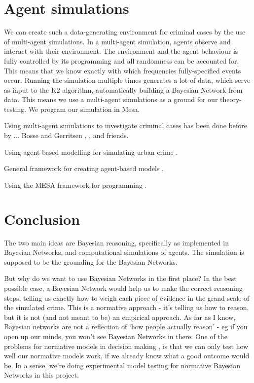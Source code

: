 \section{Agent simulations}
We can create such a data-generating environment for criminal cases by the use of multi-agent simulations. In a multi-agent simulation, agents observe and interact with their environment. The environment and the agent behaviour is fully controlled by its programming and all randomness can be accounted for. This means that we know exactly with which frequencies fully-specified events occur. Running the simulation multiple times generates a lot of data, which serve as input to the K2 algorithm, automatically building a Bayesian Network from data. This means we use a multi-agent simulations as a ground for our theory-testing. We program our simulation in Mesa.

Using multi-agent simulations to investigate criminal cases has been done before by ...
Bosse and Gerritsen \citep{Gerritsen2008}, \citep{Gerritsen2010}, \citep{Gerritsen2015} and friends.

Using agent-based modelling for simulating urban crime \citep{Zhu2021}.

General framework for creating agent-based models \citep{Lotzmann2019}.

Using the MESA framework for programming \citep{mesa2020}.





 \section{Conclusion}

The two main ideas are Bayesian reasoning, specifically as implemented in Bayesian Networks, and computational simulations of agents. The simulation is supposed to be the grounding for the Bayesian Networks.

But why do we want to use Bayesian Networks in the first place? In the best possible case, a Bayesian Network would help us to make the correct reasoning steps, telling us exactly how to weigh each piece of evidence in the grand scale of the simulated crime. This is a normative approach - it's telling us how to reason, but it is not (and not meant to be) an empirical approach. As far as I know, Bayesian networks are not a reflection of `how people actually reason' - eg if you open up our minds, you won't see Bayesian Networks in there. One of the problems for normative models in decision making \citep{colyvan2013}, is that we can only test how well our normative models work, if we already know what a good outcome would be. In a sense, we're doing experimental model testing for normative Bayesian Networks in this project.



